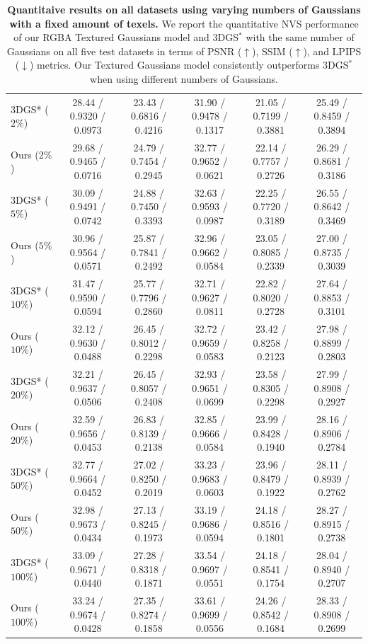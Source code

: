 {\begin{table}[ht!]
\begin{tabular*}{\textwidth}{@{\extracolsep{\fill}}lccccc@{}}
 \\
\hdashline
    3DGS* ($2\%$) & 28.44 / 0.9320 / 0.0973 & 23.43 / 0.6816 / 0.4216 & 31.90 / 0.9478 / 0.1317 & 21.05 / 0.7199 / 0.3881 & 25.49 / 0.8459 / 0.3894
\\
    Ours ($2\%$) & 29.68 / 0.9465 / 0.0716 & 24.79 / 0.7454 / 0.2945 & 32.77 / 0.9652 / 0.0621 & 22.14 / 0.7757 / 0.2726 & 26.29 / 0.8681 / 0.3186
\\
\hdashline
    3DGS* ($5\%$) & 30.09 / 0.9491 / 0.0742 & 24.88 / 0.7450 / 0.3393 & 32.63 / 0.9593 / 0.0987 & 22.25 / 0.7720 / 0.3189 & 26.55 / 0.8642 / 0.3469
 \\
    Ours ($5\%$) & 30.96 / 0.9564 / 0.0571 & 25.87 / 0.7841 / 0.2492 & 32.96 / 0.9662 / 0.0584 & 23.05 / 0.8085 / 0.2339 & 27.00 / 0.8735 / 0.3039
\\
\hdashline
    3DGS* ($10\%$) & 31.47 / 0.9590 / 0.0594 & 25.77 / 0.7796 / 0.2860 & 32.71 / 0.9627 / 0.0811 & 22.82 / 0.8020 / 0.2728 & 27.64 / 0.8853 / 0.3101
 \\
    Ours ($10\%$) & 32.12 / 0.9630 / 0.0488 & 26.45 / 0.8012 / 0.2298 & 32.72 / 0.9659 / 0.0583 & 23.42 / 0.8258 / 0.2123 & 27.98 / 0.8899 / 0.2803
\\
\hdashline
    3DGS* ($20\%$) & 32.21 / 0.9637 / 0.0506 & 26.45 / 0.8057 / 0.2408 & 32.93 / 0.9651 / 0.0699 & 23.58 / 0.8305 / 0.2298 & 27.99 / 0.8908 / 0.2927
\\
    Ours ($20\%$) & 32.59 / 0.9656 / 0.0453 & 26.83 / 0.8139 / 0.2138 & 32.85 / 0.9666 / 0.0584 & 23.99 / 0.8428 / 0.1940 & 28.16 / 0.8906 / 0.2784
\\
\hdashline
    3DGS* ($50\%$) & 32.77 / 0.9664 / 0.0452 & 27.02 / 0.8250 / 0.2019 & 33.23 / 0.9683 / 0.0603 & 23.96 / 0.8479 / 0.1922 & 28.11 / 0.8939 / 0.2762
 \\
    Ours ($50\%$) & 32.98 / 0.9673 / 0.0434 & 27.13 / 0.8245 / 0.1973 & 33.19 / 0.9686 / 0.0594 & 24.18 / 0.8516 / 0.1801 & 28.27 / 0.8915 / 0.2738
\\
\hdashline
    3DGS* ($100\%$) & 33.09 / 0.9671 / 0.0440 & 27.28 / 0.8318 / 0.1871 & 33.54 / 0.9697 / 0.0551 & 24.18 / 0.8541 / 0.1754 & 28.04 / 0.8940 / 0.2707
 \\
    Ours ($100\%$) & 33.24 / 0.9674 / 0.0428 & 27.35 / 0.8274 / 0.1858 & 33.61 / 0.9699 / 0.0556 & 24.26 / 0.8542 / 0.1684 & 28.33 / 0.8908 / 0.2699
\\
    \bottomrule
  \end{tabular*}
  \caption{\textbf{Quantitaive results on all datasets using varying numbers of Gaussians with a fixed amount of texels. } We report the quantitative NVS performance of our RGBA Textured Gaussians model and 3DGS$^*$ with the same number of Gaussians on all five test datasets in terms of  PSNR ($\uparrow$), SSIM ($\uparrow$), and LPIPS ($\downarrow$) metrics. Our Textured Gaussians model consistently outperforms 3DGS$^*$ when using different numbers of Gaussians. }
  \label{tab:supp_same_num_gs}
\end{table}
}

